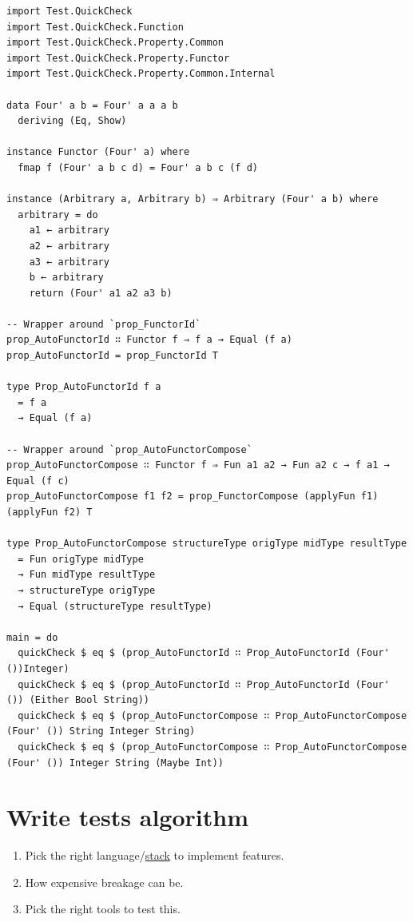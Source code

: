 \documentclass[a4paper,14pt,oneside]{book}
\begin{document}
\begin{verbatim}
import Test.QuickCheck
import Test.QuickCheck.Function
import Test.QuickCheck.Property.Common
import Test.QuickCheck.Property.Functor
import Test.QuickCheck.Property.Common.Internal

data Four' a b = Four' a a a b
  deriving (Eq, Show)

instance Functor (Four' a) where
  fmap f (Four' a b c d) = Four' a b c (f d)

instance (Arbitrary a, Arbitrary b) ⇒ Arbitrary (Four' a b) where
  arbitrary = do
    a1 ← arbitrary
    a2 ← arbitrary
    a3 ← arbitrary
    b ← arbitrary
    return (Four' a1 a2 a3 b)

-- Wrapper around `prop_FunctorId`
prop_AutoFunctorId ∷ Functor f ⇒ f a → Equal (f a)
prop_AutoFunctorId = prop_FunctorId T

type Prop_AutoFunctorId f a
  = f a
  → Equal (f a)

-- Wrapper around `prop_AutoFunctorCompose`
prop_AutoFunctorCompose ∷ Functor f ⇒ Fun a1 a2 → Fun a2 c → f a1 → Equal (f c)
prop_AutoFunctorCompose f1 f2 = prop_FunctorCompose (applyFun f1) (applyFun f2) T

type Prop_AutoFunctorCompose structureType origType midType resultType
  = Fun origType midType
  → Fun midType resultType
  → structureType origType
  → Equal (structureType resultType)

main = do
  quickCheck $ eq $ (prop_AutoFunctorId ∷ Prop_AutoFunctorId (Four' ())Integer)
  quickCheck $ eq $ (prop_AutoFunctorId ∷ Prop_AutoFunctorId (Four' ()) (Either Bool String))
  quickCheck $ eq $ (prop_AutoFunctorCompose ∷ Prop_AutoFunctorCompose (Four' ()) String Integer String)
  quickCheck $ eq $ (prop_AutoFunctorCompose ∷ Prop_AutoFunctorCompose (Four' ()) Integer String (Maybe Int))
\end{verbatim}

\section{Write tests algorithm}
\label{sec:org9ef7bbf}

\begin{enumerate}
\item Pick the right language/\hyperref[org224118a]{stack} to implement features.\\
\item How expensive breakage can be.\\
\item Pick the right tools to test this.\\
\end{enumerate}
\end{document}
